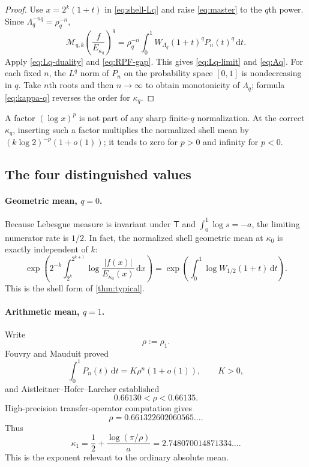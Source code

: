 \documentclass[11pt,oneside]{article}
\theoremstyle{definition}
\theoremstyle{remark}
\newcommand{\dd}{\,\mathrm d}
\newcommand{\T}{\mathsf T}
\begin{document}
\begin{proof}
Use $x=2^k(1+t)$ in \eqref{eq:shell-Lq} and raise
\eqref{eq:master} to the $q$th power.  Since
$\Lambda_q^{-nq}=\rho_q^{-n}$,
\[
 \mathcal M_{q,k}\!\left(\frac{f}{E_{\kappa_q}}\right)^q
 =\rho_q^{-n}\int_0^1W_{\Lambda_q}(1+t)^qP_n(t)^q\dd t.
\]
Apply \eqref{eq:Lq-duality} and \eqref{eq:RPF-gap}.  This gives
\eqref{eq:Lq-limit} and \eqref{eq:Aq}.  For each fixed $n$, the $L^q$ norm of
$P_n$ on the probability space $[0,1]$ is nondecreasing in $q$.  Take $n$th
roots and then $n\to\infty$ to obtain monotonicity of $\Lambda_q$; formula
\eqref{eq:kappa-q} reverses the order for $\kappa_q$.
\end{proof}

A factor $(\log x)^p$ is not part of any sharp finite-$q$ normalization.  At
the correct $\kappa_q$, inserting such a factor multiplies the normalized
shell mean by $(k\log2)^{-p}(1+o(1))$; it tends to zero for $p>0$ and infinity
for $p<0$.

\subsection{The four distinguished values}

\paragraph{Geometric mean, $q=0$.}
Because Lebesgue measure is invariant under $\T$ and
$\int_0^1\log s=-a$, the limiting numerator rate is $1/2$.  In fact, the
normalized shell geometric mean at $\kappa_0$ is exactly independent of $k$:
\begin{equation}
 \exp\!\left(2^{-k}\int_{2^k}^{2^{k+1}}
 \log\frac{|f(x)|}{E_{\kappa_0}(x)}\dd x\right)
 =\exp\!\left(\int_0^1\log W_{1/2}(1+t)\dd t\right).
 \label{eq:geometric-exact}
\end{equation}
This is the shell form of \cref{thm:typical}.

\paragraph{Arithmetic mean, $q=1$.}
Write
\begin{equation}
 \rho:=\rho_1.
 \label{eq:rho}
\end{equation}
Fouvry and Mauduit proved
\begin{equation}
 \int_0^1P_n(t)\dd t=K\rho^n(1+o(1)),
 \qquad K>0,
 \label{eq:FM}
\end{equation}
and Aistleitner--Hofer--Larcher established
\begin{equation}
 0.66130<\rho<0.66135.
 \label{eq:rho-certified}
\end{equation}
High-precision transfer-operator computation gives
\begin{equation}
 \rho=0.661322602060565\ldots .
 \label{eq:rho-numeric}
\end{equation}
Thus
\begin{equation}
 \boxed{
 \kappa_1=\frac12+\frac{\log(\pi/\rho)}a
 =2.748070014871334\ldots .}
 \label{eq:kappa1}
\end{equation}
This is the exponent relevant to the ordinary absolute mean.
\end{document}
